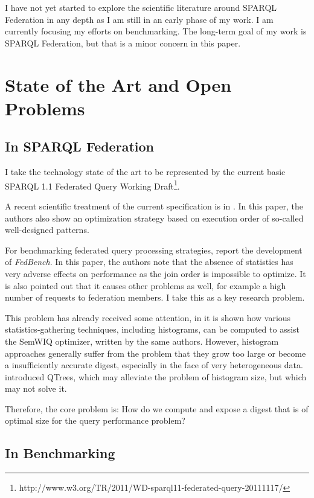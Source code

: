 \documentclass{llncs}
\begin{document}
I have not yet started to explore the scientific literature around
SPARQL Federation in any depth as I am still in an early phase of my
work. I am currently focusing my efforts on benchmarking. The
long-term goal of my work is SPARQL Federation, but that is a minor
concern in this paper.

\section{State of the Art and Open Problems}

\subsection{In SPARQL Federation}

I take the technology state of the art to be represented by the
current basic SPARQL 1.1 Federated Query Working
Draft\footnote{http://www.w3.org/TR/2011/WD-sparql11-federated-query-20111117/}. 

A recent scientific treatment of the current specification is in
\cite{springerlink:10.1007/978-3-642-21064-8-1}. In this paper, the
authors also show an optimization strategy based on execution order of
so-called well-designed patterns.

For benchmarking federated query processing strategies,
\cite{Schmidt:2011:FBS:2063016.2063054} report the development of
\emph{FedBench}. In this paper, the authors note that the
absence of statistics has very adverse effects on performance as the join
order is impossible to optimize. It is also pointed out that it causes
other problems as well, for example a high number of requests to
federation members. I take this as a key research problem.

This problem has already received some attention, in \cite{5337556} it
is shown how various statistics-gathering techniques, including
histograms, can be computed to assist the SemWIQ optimizer, written by
the same authors.  However, histogram approaches generally suffer
from the problem that they grow too large or become a insufficiently
accurate digest, especially in the face of very heterogeneous data.
\cite{Harth:2010:DSO:1772690.1772733} introduced QTrees, which may
alleviate the problem of histogram size, but which may not solve it.

Therefore, the core problem is: How do we compute and expose a digest that
is of optimal size for the query performance problem?

\subsection{In Benchmarking}
\end{document}
